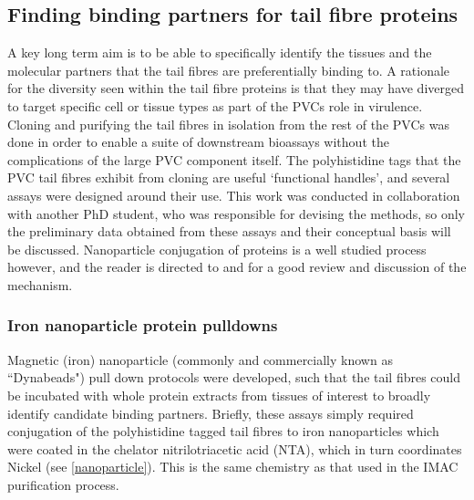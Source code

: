 \subsection{Finding binding partners for tail fibre proteins}
A key long term aim is to be able to specifically identify the tissues and the molecular partners that the tail fibres are preferentially binding to. A rationale for the diversity seen within the tail fibre proteins is that they may have diverged to target specific cell or tissue types as part of the PVCs role in virulence. Cloning and purifying the tail fibres in isolation from the rest of the PVCs was done in order to enable a suite of downstream bioassays without the complications of the large PVC component itself. The polyhistidine tags that the PVC tail fibres exhibit from cloning are useful `functional handles', and several assays were designed around their use. This work was conducted in collaboration with another PhD student, who was responsible for devising the methods, so only the preliminary data obtained from these assays and their conceptual basis will be discussed. Nanoparticle conjugation of proteins is a well studied process however, and the reader is directed to \cite{Sperling2010} and \cite{Hainfeld1999} for a good review and discussion of the mechanism.


\subsubsection{Iron nanoparticle protein pulldowns}
Magnetic (iron) nanoparticle (commonly and commercially known as ``Dynabeads") pull down protocols were developed, such that the tail fibres could be incubated with whole protein extracts from tissues of interest to broadly identify candidate binding partners. Briefly, these assays simply required conjugation of the polyhistidine tagged tail fibres to iron nanoparticles which were coated in the chelator nitrilotriacetic acid (NTA), which in turn coordinates Nickel (see \vref{nanoparticle}). This is the same chemistry as that used in the IMAC purification process.

